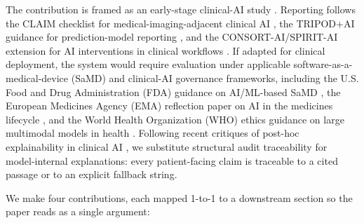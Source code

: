 \documentclass[11pt]{article}
\begin{document}
The contribution is framed as an early-stage clinical-AI study \citep{vasey2022decideai}. Reporting follows the CLAIM checklist for medical-imaging-adjacent clinical AI \citep{mongan2020claim}, the TRIPOD+AI guidance for prediction-model reporting \citep{collins2024tripodai}, and the CONSORT-AI/SPIRIT-AI extension for AI interventions in clinical workflows \citep{liu2020spiritai}. If adapted for clinical deployment, the system would require evaluation under applicable software-as-a-medical-device (SaMD) and clinical-AI governance frameworks, including the U.S. Food and Drug Administration (FDA) guidance on AI/ML-based SaMD \citep{fda2021samdaction}, the European Medicines Agency (EMA) reflection paper on AI in the medicines lifecycle \citep{ema2024reflection}, and the World Health Organization (WHO) ethics guidance on large multimodal models in health \citep{who2024llm}. Following recent critiques of post-hoc explainability in clinical AI \citep{ghassemi2021falsehope}, we substitute structural audit traceability for model-internal explanations: every patient-facing claim is traceable to a cited passage or to an explicit fallback string.

We make four contributions, each mapped 1-to-1 to a downstream section so the paper reads as a single argument:
\end{document}

